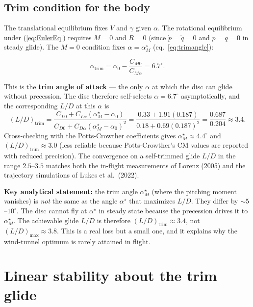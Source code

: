 \documentclass[11pt,letterpaper]{article}
\begin{document}
\subsection{Trim condition for the body}

The translational equilibrium fixes $V$ and $\gamma$ given $\alpha$. The rotational equilibrium under (\ref{eq:EulerEq}) requires $M = 0$ and $R = 0$ (since $\dot{p} = \dot{q} = 0$ and $p = q = 0$ in steady glide). The $M = 0$ condition fixes $\alpha = \alpha_M^\star$ (eq.\ \ref{eq:trimangle}):
\begin{keyeq}
\begin{equation}
\alpha_{\text{trim}} = \alpha_0 - \frac{C_{M0}}{C_{M\alpha}} = 6.7^\circ.
\label{eq:alphatrim}
\end{equation}
\end{keyeq}
This is the \textbf{trim angle of attack} --- the only $\alpha$ at which the disc can glide without precession. The disc therefore self-selects $\alpha = 6.7^\circ$ asymptotically, and the corresponding $L/D$ at this $\alpha$ is
\begin{equation}
(L/D)_{\text{trim}} = \frac{C_{L0} + C_{L\alpha}(\alpha_M^\star - \alpha_0)}{C_{D0} + C_{D\alpha}(\alpha_M^\star - \alpha_0)^2}
= \frac{0.33 + 1.91(0.187)}{0.18 + 0.69(0.187)^2}
= \frac{0.687}{0.204}
\approx 3.4.
\label{eq:LDtrim}
\end{equation}
Cross-checking with the Potts-Crowther coefficients gives $\alpha_M^\star \approx 4.4^\circ$ and $(L/D)_{\text{trim}} \approx 3.0$ (less reliable because Potts-Crowther's CM values are reported with reduced precision). The convergence on a self-trimmed glide $L/D$ in the range $2.5$--$3.5$ matches both the in-flight measurements of Lorenz (2005) and the trajectory simulations of Lukes et al.\ (2022).

\textbf{Key analytical statement:} the trim angle $\alpha_M^\star$ (where the pitching moment vanishes) is \emph{not} the same as the angle $\alpha^\star$ that maximizes $L/D$. They differ by $\sim 5$--$10^\circ$. The disc cannot fly at $\alpha^\star$ in steady state because the precession drives it to $\alpha_M^\star$. The achievable glide $L/D$ is therefore $(L/D)_{\text{trim}} \approx 3.4$, not $(L/D)_{\max} \approx 3.8$. This is a real loss but a small one, and it explains why the wind-tunnel optimum is rarely attained in flight.

\section{Linear stability about the trim glide}
\label{sec:stab}
\end{document}
